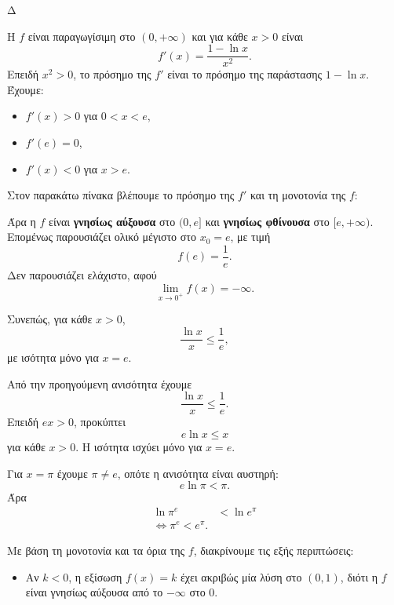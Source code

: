 \begin{thema}{Δ}
\begin{erwthma}
\item Η $f$ είναι παραγωγίσιμη στο $(0,+\infty)$ και για κάθε $x>0$ είναι
\[
f'(x)=\frac{1-\ln x}{x^2}.
\]
Επειδή $x^2>0$, το πρόσημο της $f'$ είναι το πρόσημο της παράστασης $1-\ln x$. Έχουμε:
\begin{itemize}
\item $f'(x)>0$ για $0<x<e$,
\item $f'(e)=0$,
\item $f'(x)<0$ για $x>e$.
\end{itemize}
Στον παρακάτω πίνακα βλέπουμε το πρόσημο της $f'$ και τη μονοτονία της $f$:
\begin{center}
\end{center}

Άρα η $f$ είναι \textbf{γνησίως αύξουσα} στο $(0,e]$ και \textbf{γνησίως φθίνουσα} στο $[e,+\infty)$. Επομένως παρουσιάζει ολικό μέγιστο στο $x_0=e$, με τιμή
\[
{f(e)=\frac{1}{e}}.
\]
Δεν παρουσιάζει ελάχιστο, αφού
\[
\lim_{x\to0^+}f(x)=-\infty.
\]

Συνεπώς, για κάθε $x>0$,
\[
{\frac{\ln x}{x}\leq\frac{1}{e}},
\]
με ισότητα μόνο για $x=e$.

\item Από την προηγούμενη ανισότητα έχουμε
\[
\frac{\ln x}{x}\leq\frac{1}{e}.
\]
Επειδή $ex>0$, προκύπτει
\[
{e\ln x\leq x}
\]
για κάθε $x>0$. Η ισότητα ισχύει μόνο για $x=e$.

Για $x=\pi$ έχουμε $\pi\neq e$, οπότε η ανισότητα είναι αυστηρή:
\[
e\ln\pi<\pi.
\]
Άρα
\begin{align*}
\ln\pi^e&<\ln e^\pi\\
\Leftrightarrow
{\pi^e<e^\pi}.
\end{align*}

\item Με βάση τη μονοτονία και τα όρια της $f$, διακρίνουμε τις εξής περιπτώσεις:
\begin{itemize}
\item Αν $k<0$, η εξίσωση $f(x)=k$ έχει ακριβώς μία λύση στο $(0,1)$, διότι η $f$ είναι γνησίως αύξουσα από το $-\infty$ στο $0$.


\end{itemize}
\end{erwthma}
\end{thema}
